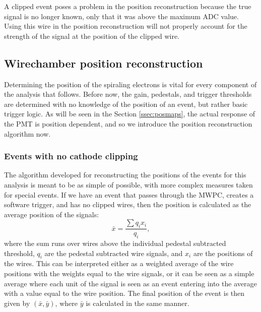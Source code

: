 A clipped event poses a problem in the position reconstruction because the true signal
is no longer known, only that it was above the maximum ADC value. Using this wire in
the position reconstruction will not properly account for the strength of the
signal at the position of the clipped wire.

\subsection{Wirechamber position reconstruction}

Determining the position of the spiraling electrons is vital for every component of the analysis
that follows. Before now, the gain, pedestals, and trigger thresholds are determined with no
knowledge of the position of an event, but rather basic trigger logic. As will be seen in
the Section \ref{ssec:posmaps}, the actual response of the PMT is position dependent, and so we introduce the
position reconstruction algorithm now.

\subsubsection{Events with no cathode clipping}

The algorithm developed for reconstructing the positions of the events for this analysis
is meant to be as simple of possible, with more complex measures taken for special events.
If we have an event that passes through the MWPC, creates a software trigger, and has no
clipped wires, then the position is calculated as the average position of the signals:
%
\begin{equation}
  \bar{x} = \frac{\sum q_i x_i}{q_i},
\end{equation}
%
where the sum runs over wires above the individual pedestal subtracted threshold, $q_i$ are the
pedestal subtracted wire signals, and $x_i$ are the positions of the wires.  This can
be interpreted either as a weighted average of the wire positions with the weights equal to
the wire signals, or it can be seen as a simple average where each unit of the signal is seen
as an event entering into the average with a value equal to the wire position. The final position
of the event is then given by $(\bar{x}, \bar{y})$, where $\bar{y}$ is calculated in the same manner.

